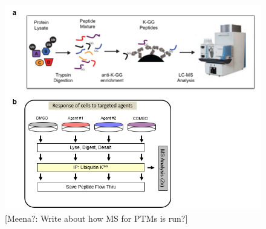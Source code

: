 \documentclass[mcp]{article}
\numberwithin{figure}{section} %
\numberwithin{table}{section}
\def\todo#1{{\color{red}[#1]}}
\begin{document}
\begin{figure}[ht]
\centering
\includegraphics[scale=.8]{images/fig1.png}
\caption{\todo{Meena?: Write about how MS for PTMs is run?}}
\label{fig:workflow}
\end{figure}
\end{document}
